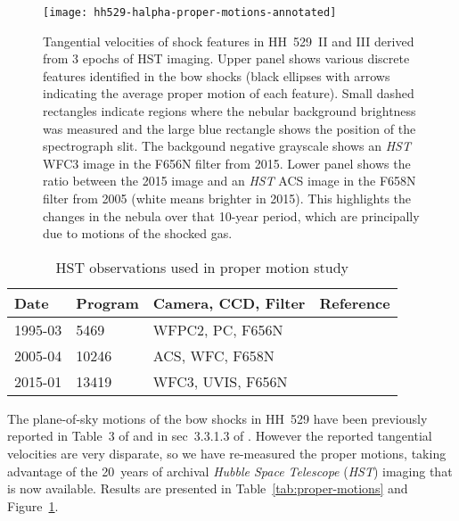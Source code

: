 \documentclass[useAMS, usenatbib]{mnras}
\begin{document}
\begin{figure}
  \centering
  \texttt{[image: hh529-halpha-proper-motions-annotated]}
  \caption{
    Tangential velocities of shock features in HH~529~II and III
    derived from 3 epochs of HST imaging.
    Upper panel shows various discrete features identified in the bow shocks
    (black ellipses with arrows indicating the average proper motion of each feature).
    Small dashed rectangles indicate regions where the nebular background brightness was measured
    and the large blue rectangle shows the position of the spectrograph slit.
    The backgound negative grayscale shows an \textit{HST} WFC3 image in the F656N filter from 2015.
    Lower panel shows the ratio between the 2015 image and an \textit{HST} ACS image
    in the F658N filter from 2005 (white means brighter in 2015).
    This highlights the changes in the nebula over that 10-year period,
    which are principally due to motions of the shocked gas.
  }
  \label{fig:proper-motions}
\end{figure}

\begin{table}
  \caption{HST observations used in proper motion study}
  \label{tab:programs}
  \setlength\tabcolsep{1ex}
  \begin{tabular}{llll}
    \toprule
    Date & Program & Camera, CCD, Filter & Reference \\
    \midrule
    1995-03 & 5469 & WFPC2, PC, F656N & \citet{Bally:1998a} \\
    2005-04 & 10246 & ACS, WFC, F658N & \citet{Robberto:2013a} \\
    2015-01 & 13419 & WFC3, UVIS, F656N & \citet{Bally:2018c} \\
    \bottomrule
  \end{tabular}
\end{table}


The plane-of-sky motions of the bow shocks in HH~529 have been previously reported
in Table~3 of \citet{ODell:2008a} and in sec~3.3.1.3 of \citet{ODell:2015a}.
However the reported tangential velocities are very disparate,
so we have re-measured the proper motions,
taking advantage of the 20~years of archival
\textit{Hubble Space Telescope} (\textit{HST}) imaging that is now available.
Results are presented in Table~\ref{tab:proper-motions} and Figure~\ref{fig:proper-motions}.
\end{document}
